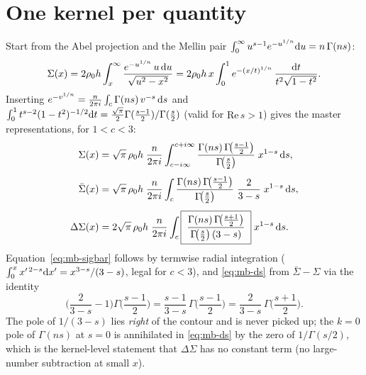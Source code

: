\documentclass{article}
\begin{document}
\section{One kernel per quantity}\label{sec:kernels}

Start from the Abel projection and the Mellin pair
$\int_0^\infty u^{s-1} e^{-u^{1/n}}{\rm d}u = n\,\Gamma(ns)$:
\begin{equation}
\Sigma(x) = 2\rho_0 h \int_x^\infty
\frac{e^{-u^{1/n}}\,u\,{\rm d}u}{\sqrt{u^2-x^2}}
= 2\rho_0 h\, x \int_0^1 e^{-(x/t)^{1/n}}\,
\frac{{\rm d}t}{t^{2}\sqrt{1-t^2}} .
\end{equation}
Inserting $e^{-v^{1/n}} = \frac{n}{2\pi i}\int_{c}\Gamma(ns)\,v^{-s}\,{\rm
d}s$ and $\int_0^1 t^{s-2}(1-t^2)^{-1/2}{\rm d}t = \frac{\sqrt\pi}{2}
\Gamma(\tfrac{s-1}{2})/\Gamma(\tfrac s2)$ (valid for $\mathrm{Re}\,s>1$)
gives the master representations, for $1<c<3$:
\begin{align}
\Sigma(x) &= \sqrt\pi\,\rho_0 h\; \frac{n}{2\pi i}\int_{c-i\infty}^{c+i\infty}
\frac{\Gamma(ns)\,\Gamma\!\big(\tfrac{s-1}{2}\big)}{\Gamma\!\big(\tfrac
s2\big)}\; x^{1-s}\,{\rm d}s, \label{eq:mb-sigma}\\[4pt]
\bar\Sigma(x) &= \sqrt\pi\,\rho_0 h\; \frac{n}{2\pi i}\int_{c}
\frac{\Gamma(ns)\,\Gamma\!\big(\tfrac{s-1}{2}\big)}{\Gamma\!\big(\tfrac
s2\big)}\;\frac{2}{3-s}\; x^{1-s}\,{\rm d}s, \label{eq:mb-sigbar}\\[4pt]
\Delta\Sigma(x) &= 2\sqrt\pi\,\rho_0 h\; \frac{n}{2\pi i}\int_{c}
\boxed{\;\frac{\Gamma(ns)\,\Gamma\!\big(\tfrac{s+1}{2}\big)}
{\Gamma\!\big(\tfrac s2\big)\,(3-s)}\;}\; x^{1-s}\,{\rm d}s .
\label{eq:mb-ds}
\end{align}
Equation~\eqref{eq:mb-sigbar} follows by termwise radial integration
($\int_0^x x'^{\,2-s}{\rm d}x' = x^{3-s}/(3-s)$, legal for $c<3$), and
\eqref{eq:mb-ds} from $\bar\Sigma-\Sigma$ via the identity
\begin{equation}
\Big(\frac{2}{3-s}-1\Big)\Gamma\!\Big(\frac{s-1}{2}\Big)
= \frac{s-1}{3-s}\,\Gamma\!\Big(\frac{s-1}{2}\Big)
= \frac{2}{3-s}\,\Gamma\!\Big(\frac{s+1}{2}\Big).
\end{equation}
The pole of $1/(3-s)$ lies \emph{right} of the contour and is never picked
up; the $k=0$ pole of $\Gamma(ns)$ at $s=0$ is annihilated in
\eqref{eq:mb-ds} by the zero of $1/\Gamma(s/2)$, which is the kernel-level
statement that $\Delta\Sigma$ has no constant term (no large-number
subtraction at small $x$).
\end{document}
